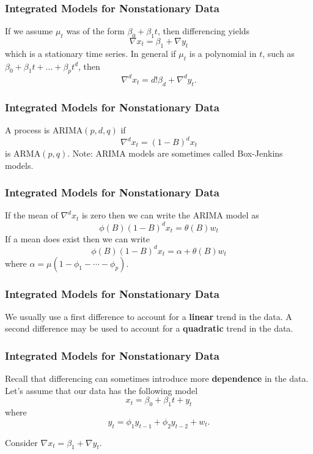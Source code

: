 \documentclass[%
xcolor=pdftex]{beamer}
\begin{document}
\begin{frame}
\frametitle{Integrated Models for Nonstationary Data}

If we assume $\mu_t$ was of the form $\beta_0+\beta_1 t$, then differencing yields
$$
\nabla x_t =\beta_1 + \nabla y_t
$$
which is a stationary time series.  In general if $\mu_t$ is a polynomial in $t$, such as $\beta_0+\beta_1 t+...+\beta_p t^d$, then
$$
\nabla^d x_t =d! \beta_d + \nabla^d y_t.
$$

\end{frame}

\begin{frame}
\frametitle{Integrated Models for Nonstationary Data}

A process is ARIMA$(p,d,q)$ if
$$
\nabla^d x_t=(1-B)^d x_t
$$
is ARMA$(p,q)$. Note: ARIMA models are sometimes called Box-Jenkins models.

\end{frame}

\begin{frame}
\frametitle{Integrated Models for Nonstationary Data}

If the mean of $\nabla^d x_t$ is zero then we can write the ARIMA model as
\begin{equation}
\phi(B)(1-B)^d x_t = \theta(B) w_t
\end{equation}
If a mean does exist then we can write
\begin{equation}
\phi(B)(1-B)^d x_t = \alpha + \theta(B) w_t
\end{equation}
where $\alpha=\mu(1-\phi_1- \cdots -\phi_p)$.

\end{frame}

\begin{frame}
\frametitle{Integrated Models for Nonstationary Data}

We usually use a first difference to account for a \textbf{linear} trend in the data. A second difference may be used to account for a \textbf{quadratic} trend in the data.

\end{frame}

\begin{frame}
\frametitle{Integrated Models for Nonstationary Data}

Recall that differencing can sometimes introduce more \textbf{dependence} in the data. Let's assume that our data has the following model
$$
x_t =\beta_0+\beta_1 t + y_t
$$
where
$$
y_t=\phi_1 y_{t-1}+\phi_2 y_{t-2}+w_t.
$$

Consider $\nabla x_t=\beta_1+ \nabla y_t$.

\end{frame}
\end{document}
